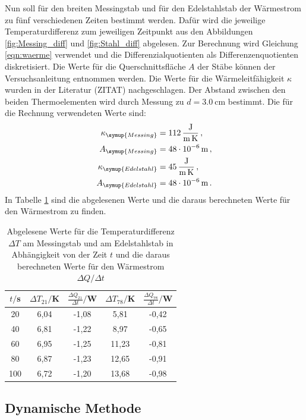 Nun soll für den breiten Messingstab und für den Edelstahlstab der Wärmestrom
zu fünf verschiedenen Zeiten bestimmt werden. Dafür wird die jeweilige Temperaturdifferenz
zum jeweiligen Zeitpunkt aus den Abbildungen \ref{fig:Messing_diff} und
\ref{fig:Stahl_diff} abgelesen. Zur Berechnung wird Gleichung \eqref{eqn:waerme}
verwendet und die Differenzialquotienten als Differenzenquotienten diskretisiert. Die Werte für die Querschnittsfläche $A$ der Stäbe können der Versuchsanleitung
\cite{Versuchsanleitung} entnommen werden. Die Werte für die Wärmeleitfähigkeit $\kappa$ wurden in der
Literatur (ZITAT) nachgeschlagen. Der Abstand zwischen den beiden Thermoelementen
wird durch Messung zu $d=\SI{3.0}{\centi\meter}$ bestimmt. Die für die Rechnung verwendeten Werte sind:
\begin{align}
  \kappa_{\symup{Messing}} &= \SI{112}{\joule\per\meter\per\kelvin}\,, \nonumber\\
  A_{\symup{Messing}} &= \SI{48e-6}{\meter}\,, \nonumber\\
  \kappa_{\symup{Edelstahl}} &= \SI{45}{\joule\per\meter\per\kelvin}\,, \nonumber\\
  A_{\symup{Edelstahl}} &= \SI{48e-6}{\meter}\,. \nonumber
\end{align}
In Tabelle \ref{tab:waermestrom} sind die abgelesenen Werte und die daraus berechneten Werte
für den Wärmestrom zu finden.

\begin{table}
  \centering
  \caption{Abgelesene Werte für die Temperaturdifferenz $\Delta T$ am Messingstab und am Edelstahlstab
  in Abhängigkeit von der Zeit $t$ und die daraus berechneten Werte für den Wärmestrom
  $\Delta Q/\Delta t$}
  \label{tab:waermestrom}
  \begin{tabular}{c c c c c}
    \toprule
    $t/$s & $\Delta T_{21}/$K & $\frac{\Delta Q_{21}}{\Delta t}/$W & $\Delta T_{78}/$K & $\frac{\Delta Q_{78}}{\Delta t}/$W \\
    \midrule
    20  & 6,04  & -1,08 & 5,81  & -0,42 \\
    40  & 6,81  & -1,22 & 8,97  & -0,65 \\
    60  & 6,95  & -1,25 & 11,23 & -0,81 \\
    80  & 6,87  & -1,23 & 12,65 & -0,91 \\
    100 & 6,72  & -1,20 & 13,68 & -0,98 \\
    \bottomrule
  \end{tabular}
\end{table}


\subsection{Dynamische Methode}
\label{sec:auswertung_dynamisch}

